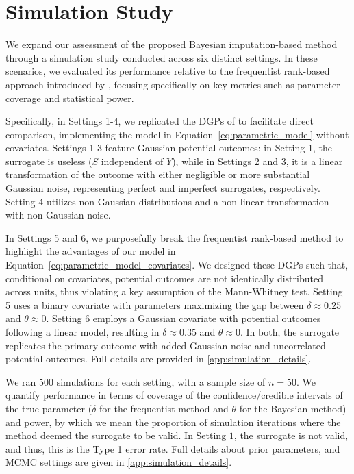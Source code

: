 \documentclass[referee,usenatbib]{biom}
\begin{document}
\section{Simulation Study}\label{sec:simulation_study}

We expand our assessment of the proposed Bayesian imputation-based method through a simulation study conducted across six distinct settings. In these scenarios, we evaluated its performance relative to the frequentist rank-based approach introduced by \citet{parast2024rank}, focusing specifically on key metrics such as parameter coverage and statistical power.

Specifically, in Settings 1-4, we replicated the DGPs of \citet{parast2024rank} to facilitate direct comparison, implementing the model in Equation~\eqref{eq:parametric_model} without covariates. Settings 1-3 feature Gaussian potential outcomes: in Setting 1, the surrogate is useless (\(S\) independent of \(Y\)), while in Settings 2 and 3, it is a linear transformation of the outcome with either negligible or more substantial Gaussian noise, representing perfect and imperfect surrogates, respectively. Setting 4 utilizes non-Gaussian distributions and a non-linear transformation with non-Gaussian noise.


In Settings 5 and 6, we purposefully break the frequentist rank-based method to highlight the advantages of our model in Equation~\eqref{eq:parametric_model_covariates}. We designed these DGPs such that, conditional on covariates, potential outcomes are not identically distributed across units, thus violating a key assumption of the Mann-Whitney test. Setting 5 uses a binary covariate with parameters maximizing the gap between \(\delta \approx 0.25\) and \(\theta \approx 0\). Setting 6 employs a Gaussian covariate with potential outcomes following a linear model, resulting in \(\delta \approx 0.35\) and \(\theta \approx 0\). In both, the surrogate replicates the primary outcome with added Gaussian noise and uncorrelated potential outcomes. Full details are provided in \ref{app:simulation_details}.

We ran \(500\) simulations for each setting, with a sample size of \(n = 50\). We quantify performance in terms of coverage of the confidence/credible intervals of the true parameter (\(\delta\) for the frequentist method and \(\theta\) for the Bayesian method) and power, by which we mean the proportion of simulation iterations where the method deemed the surrogate to be valid. In Setting \(1\), the surrogate is not valid, and thus, this is the Type 1 error rate. Full details about prior parameters, and MCMC settings are given in \ref{app:simulation_details}.
\end{document}

